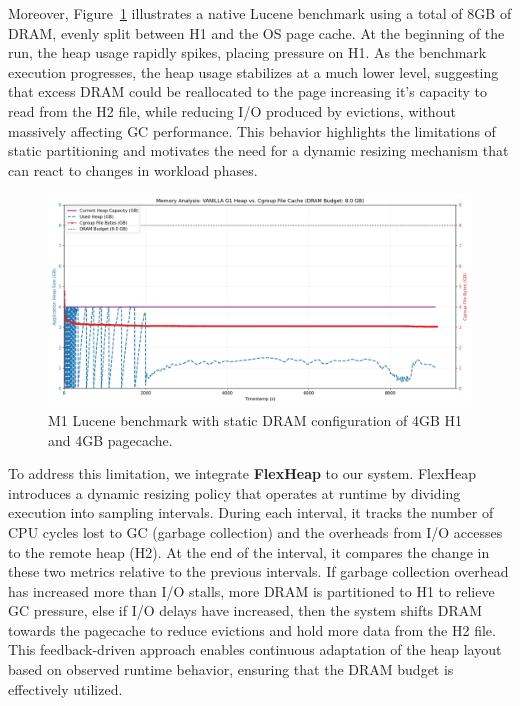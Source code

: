 Moreover, Figure~\ref{fig:vanilla-dram-underutilization} illustrates a native
Lucene benchmark using a total of 8GB of DRAM, evenly split between H1 and the
OS page cache. At the beginning of the run, the heap usage rapidly spikes,
placing pressure on H1. As the benchmark execution progresses, the heap usage
stabilizes at a much lower level, suggesting that excess DRAM could be
reallocated to the page increasing it's capacity to read from the H2 file,
while reducing I/O produced by evictions, without massively affecting GC
performance. This behavior highlights the limitations of static partitioning
and motivates the need for a dynamic resizing mechanism that can react to
changes in workload phases.
\begin{figure}[htbp]
	\centering
	\includegraphics[width=1\linewidth]{fig/combined_memory_timeline_vanilla_g1.png}
	\caption{
		M1 Lucene benchmark with static DRAM configuration of 4GB H1 and 4GB pagecache.
	}
	\label{fig:vanilla-dram-underutilization}
\end{figure}

To address this limitation, we integrate \textbf{FlexHeap} to our system.
FlexHeap introduces a dynamic resizing policy that operates at runtime by
dividing execution into sampling intervals. During each interval, it tracks the
number of CPU cycles lost to GC (garbage collection) and the overheads from I/O
accesses to the remote heap (H2). At the end of the interval, it compares the
change in these two metrics relative to the previous intervals. If garbage
collection overhead has increased more than I/O stalls, more DRAM is
partitioned to H1 to relieve GC pressure, else if I/O delays have increased,
then the system shifts DRAM towards the pagecache to reduce evictions and hold
more data from the H2 file. This feedback-driven approach enables continuous
adaptation of the heap layout based on observed runtime behavior, ensuring that
the DRAM budget is effectively utilized.


